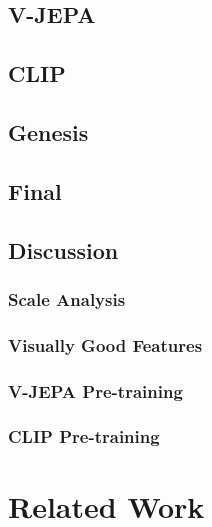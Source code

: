 \documentclass[a4paper,11pt,oneside]{report}
\begin{document}
\section{V-JEPA}
\section{CLIP}
\section{Genesis}
\section{Final}
\section{Discussion}
\subsection{Scale Analysis}
\subsection{Visually Good Features}
\subsection{V-JEPA Pre-training}
\subsection{CLIP Pre-training}




\chapter{Related Work}



\end{document}
